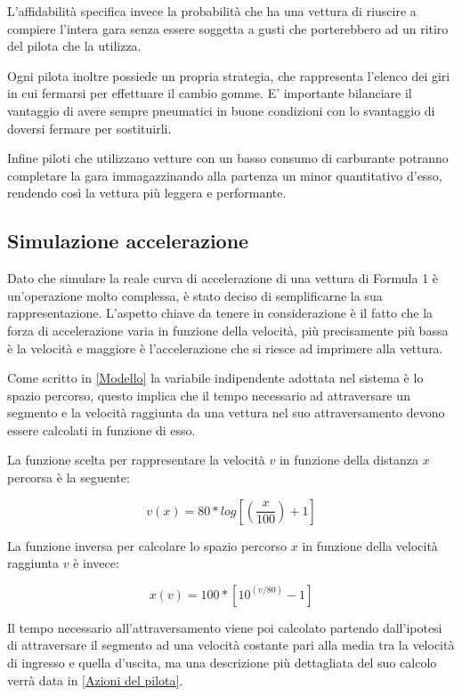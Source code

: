 \documentclass[a4paper,11pt, twoside, openright]{book}
\begin{document}
      L'affidabilità specifica invece la probabilità che ha una vettura di riuscire a compiere l'intera
      gara senza essere soggetta a gusti che porterebbero ad un ritiro del pilota che la utilizza.
      
      Ogni pilota inoltre possiede un propria strategia, che rappresenta l'elenco dei giri in cui fermarsi per effettuare il
      cambio gomme. E' importante bilanciare il vantaggio di avere sempre pneumatici in buone condizioni con lo svantaggio
      di doversi fermare per sostituirli.
      
      Infine piloti che utilizzano vetture con un basso consumo di carburante potranno completare la gara
      immagazzinando alla partenza un minor quantitativo d'esso, rendendo così la vettura più leggera e performante.
      
      \subsection{Simulazione accelerazione}
	Dato che simulare la reale curva di accelerazione di una vettura di Formula 1 è un'operazione molto complessa,
	è stato deciso di semplificarne la sua rappresentazione.
	L'aspetto chiave da tenere in considerazione è il fatto che la forza di accelerazione varia in funzione della velocità,
	più precisamente più bassa è la velocità e maggiore è l'accelerazione che si riesce ad imprimere alla vettura.
	
	Come scritto in \ref{Modello} la variabile indipendente adottata nel sistema è lo spazio percorso, questo implica
	che il tempo necessario ad attraversare un segmento e la velocità raggiunta da una vettura nel suo attraversamento
	devono essere calcolati in funzione di esso. 
	
	La funzione scelta per rappresentare la velocità $v$ in funzione della distanza $x$ percorsa è 
	la seguente:
	
	$$v(x)=80*log[(\frac{x}{100})+1]$$
	
	La funzione inversa per calcolare lo spazio percorso $x$ in funzione della velocità raggiunta $v$ è invece:
	
	$$x(v)=100*[10^{(v/80)}-1]$$
	
	Il tempo necessario all'attraversamento viene poi calcolato partendo dall'ipotesi di attraversare 
	il segmento ad una velocità
	costante pari alla media tra la velocità di ingresso e quella d'uscita, ma una descrizione più dettagliata
	del suo calcolo verrà data in \ref{Azioni del pilota}.
		
\end{document}
